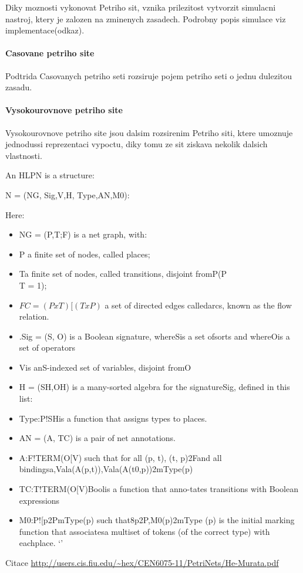 Diky moznosti vykonovat Petriho sit, vznika prilezitost vytvorzit simulacni nastroj, ktery je zalozen na zminenych zasadech. Podrobny popis simulace viz implementace(odkaz).

\paragraph*{Casovane petriho site}
Podtrida Casovanych petriho seti rozsiruje pojem petriho seti o jednu dulezitou zasadu. 
\paragraph*{Vysokourovnove petriho site}
Vysokourovnove petriho site jsou dalsim rozsirenim Petriho siti, ktere umoznuje jednodussi reprezentaci vypoctu, diky tomu ze sit ziskava nekolik dalsich vlastnosti. 

An HLPN is a structure:

N = (NG, Sig,V,H, Type,AN,M0):

Here:
\begin{itemize}
  \item NG = (P,T;F) is a net graph, with: \\
  \item P a finite set of nodes, called places; \\
  \item Ta finite set of nodes, called transitions, disjoint fromP(P\\T = 1); \\
  \item $F C= (PxT)[(TxP)$  a  set  of  directed  edges  calledarcs, known as the flow relation. \\
  \item .Sig = (S, O)  is  a  Boolean  signature,  whereSis  a  set  ofsorts  and  whereOis  a  set  of  operators \\
  \item Vis anS-indexed set of variables, disjoint fromO \\
  \item H = (SH,OH) is a many-sorted algebra for the signatureSig, defined in this list: \\
  \item Type:P!SHis a function that assigns types to places. \\
  \item AN = (A, TC) is a pair of net annotations. \\
  \item A:F!TERM(O[V)  such  that  for  all  (p, t),  (t, p)2Fand  all  bindingsa,Vala(A(p,t)),Vala(A(t0,p))2mType(p) \\
  \item TC:T!TERM(O[V)Boolis  a  function  that  anno-tates transitions with Boolean expressions \\
  \item M0:P![p2PmType(p)  such  that8p2P,M0(p)2mType  (p)  is  the  initial  marking  function  that  associatesa  multiset  of  tokens  (of  the  correct  type)  with  eachplace. `'
\end{itemize}  
Citace \url{http://users.cis.fiu.edu/~hex/CEN6075-11/PetriNets/He-Murata.pdf}
